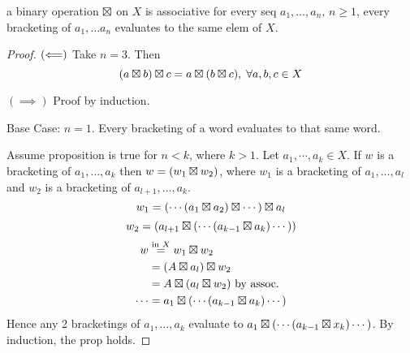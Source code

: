 \documentclass[12pt]{article}
\begin{document}
\bbox
\begin{prop}
  a binary operation \(\boxtimes\) on \(X\) is associative  for every
  seq \(a_1,\dots,a_n,\,n\ge 1\), every bracketing of \(a_1,\dots a_n\) 
  evaluates to the same elem of \(X\).
\end{prop}
\ebox

\begin{proof}
  \((\Longleftarrow)\) Take \(n=3\). Then
  \[(a\boxtimes b)\boxtimes c=a\boxtimes(b\boxtimes c),\;\forall a,b,c\in X\]

  \((\implies)\) Proof by induction.

  Base Case: \(n=1\). Every bracketing of a word evaluates to that same word.
  
  Assume proposition is true for \(n<k\), where \(k>1\). Let \(a_1,\cdots,a_k
  \in X\). If \(w\) is a bracketing of \(a_1,\dots,a_k\) then
  \(w=(w_1\boxtimes w_2)\), where
  \(w_1\) is a bracketing of \(a_1,\dots,a_l\) and \(w_2\) is a bracketing of
  \(a_{l+1},\dots,a_k\).
  \[w_1=(\cdots(a_1\boxtimes a_2)\boxtimes\cdots)\boxtimes a_l\]
  \[w_2=(a_{l+1}\boxtimes(\cdots(a_{k-1}\boxtimes a_k)\cdots))\]
  \begin{equation*}
    \begin{split}
      w&\overset{\text{in }X}=w_1\boxtimes w_2\\
       &=(A\boxtimes a_l)\boxtimes w_2\\
       &=A\boxtimes(a_l\boxtimes w_2)\text{ by assoc.}\\
      \cdots&= a_1\boxtimes(\cdots(a_{k-1}\boxtimes a_k)\cdots)
    \end{split}
  \end{equation*}
  Hence any 2 bracketings of \(a_1,\dots,a_k\) evaluate to \(a_1\boxtimes
  (\cdots(a_{k-1}\boxtimes x_k)\cdots)\). By induction, the prop holds.
\end{proof}




\end{document}
